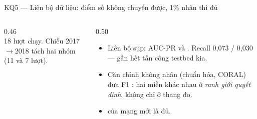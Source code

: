 \documentclass[aspectratio=169, 11pt]{beamer}
\begin{document}
\begin{frame}{KQ5 --- Liên bộ dữ liệu: điểm số không chuyển được, 1\% nhãn thì đủ}
  \begin{columns}[T]
    \begin{column}{0.46\textwidth}
      \centering\small
      \\[0.15em]
      {\scriptsize 18 lượt chạy. Chiều 2017$\rightarrow$2018 tách hai nhóm (11 và 7 lượt).}
      \\[0.3em]
    \end{column}
    \begin{column}{0.50\textwidth}
      \begin{itemize}\small
        \item Liên bộ sụp: AUC-PR  và
              . Recall 0,073 / 0,030 --- 
              gần hết tấn công testbed kia.
        \item Căn chỉnh không nhãn (chuẩn hóa, CORAL) đưa F1 : hai
              miền khác nhau ở \emph{ranh giới quyết định}, không chỉ ở thang đo.
        \item {} của mạng mới là đủ.

\end{itemize}
\end{column}
\end{columns}
\end{frame}
\end{document}
